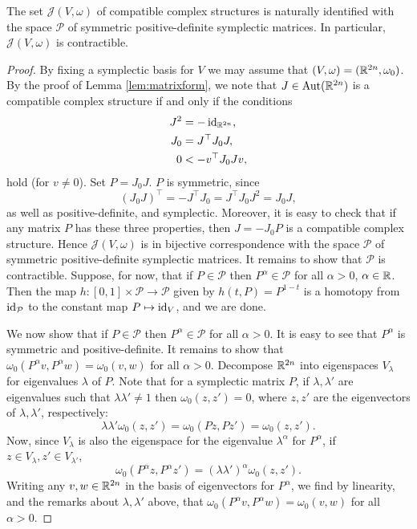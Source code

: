 \documentclass{amsart}
\begin{document}
\begin{proposition}
    The set $\mathcal{J}(V,\omega)$ of compatible complex structures is naturally identified
    with the space $\mathcal{P}$ of symmetric positive-definite symplectic matrices. In particular,
    $\mathcal{J}(V,\omega)$ is contractible.
    \label{prop:contr}
\end{proposition}
\begin{proof}
    By fixing a symplectic basis for $V$ we may assume that $(V,\omega)=(\mathbb{R}^{2n},\omega_0)$.
    By the proof of Lemma \ref{lem:matrixform}, we note that $J\in\operatorname{Aut}(\mathbb{R}^{2n})$ is a compatible
    complex structure if and only if the conditions
    \begin{align*}
        J^2 &= -\operatorname{id}_{\mathbb{R}^{2n}},\\
        J_0&=J^\top J_0J,\\
        0&<-v^\top J_0Jv,
    \end{align*}
    hold (for $v\neq0$). Set $P=J_0J$. $P$ is symmetric, since
    \begin{equation*}
        (J_0J)^\top = -J^\top J_0=J^\top J_0J^2=J_0J,
    \end{equation*}
    as well as positive-definite, and symplectic. Moreover, it is easy to check that 
    if any matrix $P$ has these three properties, then $J=-J_0P$ is a compatible complex structure.
    Hence $\mathcal{J}(V,\omega)$ is in bijective correspondence with the space $\mathcal{P}$ of
    symmetric positive-definite symplectic matrices.
    It remains to show that $\mathcal{P}$ is contractible. Suppose, for now, that if $P\in\mathcal{P}$
    then $P^{\alpha}\in\mathcal{P}$ for all $\alpha>0$, $\alpha\in\mathbb{R}$. Then the map
    $h:[0,1]\times\mathcal{P}\to\mathcal{P}$ given by $h(t,P)=P^{1-t}$ is a homotopy from
    $\operatorname{id}_\mathcal{P}$ to the constant map $P\mapsto \operatorname{id}_V$, and we are done.

    We now show that if $P\in\mathcal{P}$ then $P^\alpha\in\mathcal{P}$ for all $\alpha>0$.
    It is easy to see that $P^\alpha$ is symmetric and positive-definite. It remains to
    show that $\omega_0(P^\alpha v,P^\alpha w)=\omega_0(v,w)$ for all $\alpha>0$. Decompose
    $\mathbb{R}^{2n}$ into eigenspaces $V_\lambda$ for eigenvalues $\lambda$ of $P$. Note that for
    a symplectic matrix $P$, if $\lambda,\lambda'$ are eigenvalues such that $\lambda\lambda'\neq1$
    then $\omega_0(z,z')=0$, where $z,z'$ are the eigenvectors of $\lambda,\lambda'$, respectively:
    \begin{equation*}
        \lambda\lambda'\omega_0(z,z')=\omega_0(Pz,Pz')=\omega_0(z,z').
    \end{equation*}
    Now, since $V_\lambda$ is also the eigenspace for the eigenvalue $\lambda^\alpha$ for $P^\alpha$,
    if $z\in V_\lambda,z'\in V_{\lambda'}$,
    \begin{equation*}
        \omega_0(P^\alpha z,P^\alpha z') = (\lambda\lambda')^\alpha\omega_0(z,z').
    \end{equation*}
    Writing any $v,w\in\mathbb{R}^{2n}$ in the basis of eigenvectors for $P^\alpha$, we find by linearity,
    and the remarks about $\lambda,\lambda'$ above, that $\omega_0(P^\alpha v,P^\alpha w)=\omega_0(v,w)$
    for all $\alpha>0$.
\end{proof}
\end{document}
